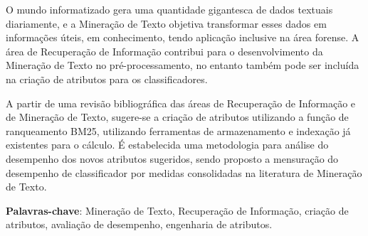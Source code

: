\setlength{\absparsep}{18pt} %
\begin{resumo}
    
    O mundo informatizado gera uma quantidade gigantesca de dados textuais diariamente, e a Mineração de Texto objetiva transformar esses dados em informações úteis, em conhecimento, tendo aplicação inclusive na área forense.
    A área de Recuperação de Informação contribui para o desenvolvimento da Mineração de Texto no pré-processamento, no entanto também pode ser incluída na criação de atributos para os classificadores.
    
    A partir de uma revisão bibliográfica das áreas de Recuperação de Informação e de Mineração de Texto, sugere-se a criação de atributos utilizando a função de ranqueamento BM25, utilizando ferramentas de armazenamento e indexação já existentes para o cálculo.
    É estabelecida uma metodologia para análise do desempenho dos novos atributos sugeridos, sendo proposto a mensuração do desempenho de classificador por medidas consolidadas na literatura de Mineração de Texto.
    
    \vspace{\onelineskip}
    
	\noindent
    \textbf{Palavras-chave}: Mineração de Texto, Recuperação de Informação, criação de atributos, avaliação de desempenho, engenharia de atributos.
    
\end{resumo}